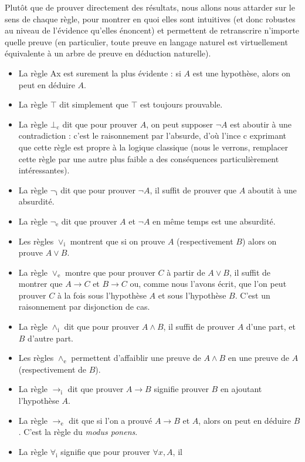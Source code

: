 Plutôt que de prouver directement des résultats, nous allons nous attarder sur
le sens de chaque règle, pour montrer en quoi elles sont intuitives (et donc
robustes au niveau de l'évidence qu'elles énoncent) et permettent de
retranscrire n'importe quelle preuve (en particulier, toute preuve en langage
naturel est virtuellement équivalente à un arbre de preuve en déduction
naturelle).
\begin{itemize}
\item La règle Ax est surement la plus évidente : si $A$ est une hypothèse,
  alors on peut en déduire $A$.
\item La règle $\top$ dit simplement que $\top$ est toujours prouvable.
\item La règle $\bot_\mathrm c$ dit que pour prouver $A$, on peut supposer
  $\lnot A$ est aboutir à une contradiction : c'est le raisonnement par
  l'absurde, d'où l'ince \og c\fg{} exprimant que cette règle est propre à la
  logique classique (nous le verrons, remplacer cette règle par une autre plus
  faible a des conséquences particulièrement intéressantes).
\item La règle $\lnot_\mathrm i$ dit que pour prouver $\lnot A$, il suffit de
  prouver que $A$ aboutit à une absurdité.
\item La règle $\lnot_\mathrm e$ dit que prouver $A$ et $\lnot A$ en même temps
  est une absurdité.
\item Les règles $\lor_\mathrm i$ montrent que si on prouve $A$ (respectivement
  $B$) alors on prouve $A\lor B$.
\item La règle $\lor_\mathrm e$ montre que pour prouver $C$ à partir de
  $A\lor B$, il suffit de montrer que $A\to C$ et $B\to C$ ou, comme nous
  l'avons écrit, que l'on peut prouver $C$ à la fois sous l'hypothèse $A$ et
  sous l'hypothèse $B$. C'est un raisonnement par disjonction de cas.
\item La règle $\land_\mathrm i$ dit que pour prouver $A\land B$, il suffit de
  prouver $A$ d'une part, et $B$ d'autre part.
\item Les règles $\land_\mathrm e$ permettent d'affaiblir une preuve de
  $A\land B$ en une preuve de $A$ (respectivement de $B$).
\item La règle $\to_\mathrm i$ dit que prouver $A\to B$ signifie prouver $B$ en
  ajoutant l'hypothèse $A$.
\item La règle $\to_\mathrm e$ dit que si l'on a prouvé $A\to B$ et $A$, alors on
  peut en déduire $B$. C'est la règle du \textit{modus ponens}.
\item La règle $\forall_\mathrm i$ signifie que pour prouver $\forall x, A$, il

\end{itemize}

